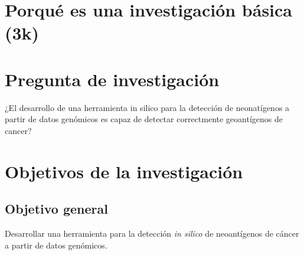 \documentclass[a4paper,11pt]{article}
\begin{document}
\section{Porqué es una investigación básica (3k)}
	
\section{Pregunta de investigación}	

¿El desarrollo de una herramienta in silico para la detección de neonatígenos a partir de datos genómicos es capaz de detectar correctmente geoantígenos de cancer?
	
\section{Objetivos de la investigación}
	
	\subsection{Objetivo general}
	
	Desarrollar una herramienta  para la detección \textit{in silico} de neoantígenos de cáncer a partir de datos genómicos.
	
\end{document}

